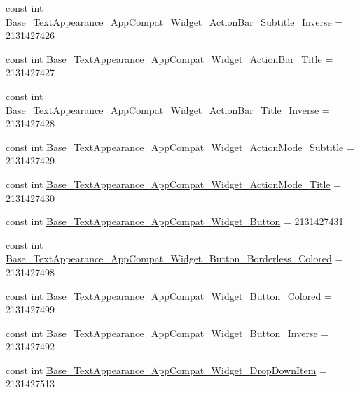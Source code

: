 \begin{DoxyCompactItemize}
\item 
const int \mbox{\hyperlink{class_f_w_p_s___app_1_1_droid_1_1_resource_1_1_style_ac8695353aa13c32f3f72d845f4e8f5a7}{Base\+\_\+\+Text\+Appearance\+\_\+\+App\+Compat\+\_\+\+Widget\+\_\+\+Action\+Bar\+\_\+\+Subtitle\+\_\+\+Inverse}} = 2131427426
\item 
const int \mbox{\hyperlink{class_f_w_p_s___app_1_1_droid_1_1_resource_1_1_style_a867cd28e76c56a3e4b4b536a3a21e125}{Base\+\_\+\+Text\+Appearance\+\_\+\+App\+Compat\+\_\+\+Widget\+\_\+\+Action\+Bar\+\_\+\+Title}} = 2131427427
\item 
const int \mbox{\hyperlink{class_f_w_p_s___app_1_1_droid_1_1_resource_1_1_style_a1a69acbfc9f45ac9fa27b526e5882375}{Base\+\_\+\+Text\+Appearance\+\_\+\+App\+Compat\+\_\+\+Widget\+\_\+\+Action\+Bar\+\_\+\+Title\+\_\+\+Inverse}} = 2131427428
\item 
const int \mbox{\hyperlink{class_f_w_p_s___app_1_1_droid_1_1_resource_1_1_style_ab47a1a8b4b65b94ee8d8eb38e876509e}{Base\+\_\+\+Text\+Appearance\+\_\+\+App\+Compat\+\_\+\+Widget\+\_\+\+Action\+Mode\+\_\+\+Subtitle}} = 2131427429
\item 
const int \mbox{\hyperlink{class_f_w_p_s___app_1_1_droid_1_1_resource_1_1_style_a7d8d2cd15b79580887f6addd8806a98a}{Base\+\_\+\+Text\+Appearance\+\_\+\+App\+Compat\+\_\+\+Widget\+\_\+\+Action\+Mode\+\_\+\+Title}} = 2131427430
\item 
const int \mbox{\hyperlink{class_f_w_p_s___app_1_1_droid_1_1_resource_1_1_style_a40fca5292e58e33f8b50daaeaef1de1f}{Base\+\_\+\+Text\+Appearance\+\_\+\+App\+Compat\+\_\+\+Widget\+\_\+\+Button}} = 2131427431
\item 
const int \mbox{\hyperlink{class_f_w_p_s___app_1_1_droid_1_1_resource_1_1_style_a03ecdfb9e8ba78121e6ab24c289f5357}{Base\+\_\+\+Text\+Appearance\+\_\+\+App\+Compat\+\_\+\+Widget\+\_\+\+Button\+\_\+\+Borderless\+\_\+\+Colored}} = 2131427498
\item 
const int \mbox{\hyperlink{class_f_w_p_s___app_1_1_droid_1_1_resource_1_1_style_a3b0ad53f38682264dadb0cc3fadc355b}{Base\+\_\+\+Text\+Appearance\+\_\+\+App\+Compat\+\_\+\+Widget\+\_\+\+Button\+\_\+\+Colored}} = 2131427499
\item 
const int \mbox{\hyperlink{class_f_w_p_s___app_1_1_droid_1_1_resource_1_1_style_a344eb93d2541ceb489667fb394102782}{Base\+\_\+\+Text\+Appearance\+\_\+\+App\+Compat\+\_\+\+Widget\+\_\+\+Button\+\_\+\+Inverse}} = 2131427492
\item 
const int \mbox{\hyperlink{class_f_w_p_s___app_1_1_droid_1_1_resource_1_1_style_a033dca630f6508f4067020bbff8836bb}{Base\+\_\+\+Text\+Appearance\+\_\+\+App\+Compat\+\_\+\+Widget\+\_\+\+Drop\+Down\+Item}} = 2131427513

\end{DoxyCompactItemize}
